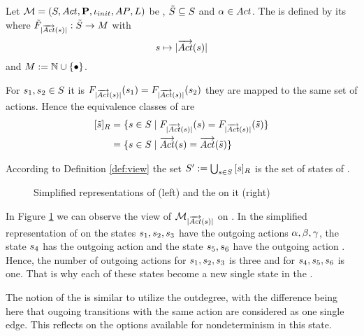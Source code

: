 \documentclass[preview]{standalone}
\begin{document}
\begin{definition}
	Let ${{{\mathcal{M}}}} = {{({S}, {Act}, {\textbf{P}}, {\iota_{init}}, {AP}, {L})}}$ be \achgphN, ${\tilde{{S}}} \subseteq {S}$ and ${\alpha} \in {Act}$. The \viewN \viewoutactsetsize is defined by its \grpfctN \gfctoutactsetsize where ${{\tilde{F}_{{|{\overrightarrow{{Act}}}({s})|}}}} : {\tilde{{S}}} \to {\ensuremath{{M}}}$ with
	\[
	{s} \mapsto |{\overrightarrow{{Act}}}({s})|
	\]
	and $\imggrp := \natnums \cup \remset$.
\end{definition}

For ${s}_1, {s}_2 \in {S}$ it is ${{F_{{|{\overrightarrow{{Act}}}({s})|}}}}({s}_1) = {{F_{{|{\overrightarrow{{Act}}}({s})|}}}}({s}_2)$ \iffN they are mapped to the same set of actions. Hence the equivalence classes of \eqrelview are
\begin{align*}
	{\ensuremath{{[{\tilde{{s}}}]_{{R}}}}} &= \{ {s} \in {S} \mid {\ensuremath{{F_{{|{\overrightarrow{{Act}}}({s})|}}}}}({s}) = {{F_{{|{\overrightarrow{{Act}}}({s})|}}}}({\tilde{{s}}})\} \\
	&= \{ {s} \in {S} \mid {\overrightarrow{\ensuremath{{Act}}}}({s}) = {\overrightarrow{{Act}}}({\tilde{{s}}})\}
\end{align*}

According to Definition \ref{def:view} the set ${S}' := \bigcup_{{s} \in {S}} {{[{s}]_{{R}}}}$ is the set of states of \viewweakoutactident.

\begin{figure}[h]
	\begin{minipage}{.5\textwidth}
		\hspace{5mm}
		
	\end{minipage}%
	\begin{minipage}{.5\textwidth}						
		\centering
		
	\end{minipage}	
	\caption{Simplified representations of \mdp (left) and the \viewN \viewoutactsetsize on it (right)}	
	\label{fig:outActSetSize}  	
\end{figure}

In Figure \ref{fig:outActSetSize} we can observe the view of ${{{{{\mathcal{M}}}}_{{|{\overrightarrow{{Act}}}({s})|}}}}$ on \chgph. In the simplified representation of \achgphN on the states ${s}_1, {s}_2, {s}_3$ have the outgoing actions ${\alpha}, {\beta}, {\gamma}$, the state ${s}_4$ has the outgoing action \action and the state ${s}_5, {s}_6$ have the outgoing action \actionc. Hence, the number of outgoing actions for ${s}_1, {s}_2, {s}_3$ is three and for ${s}_4, {s}_5, {s}_6$ is one. That is why each of these states become a new single state in the \viewN \viewoutactsetsize.

The notion of the \viewN \viewoutactsetsize is similar to utilize the outdegree, with the difference being here that ougoing transitions with the same action are considered as one single edge. This reflects on the options available for nondeterminism in this state.
\end{document}
